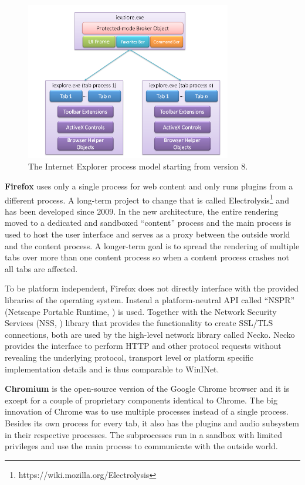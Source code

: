 \begin{figure}
    \centering
    \includegraphics[width=9cm]{Images/IE8_process_model.png}
    \caption{The Internet Explorer process model starting from version 8. \cite{IE8LCIEP}}
    \label{fig:ie8proc}
\end{figure}

\textbf{Firefox} uses only a single process for web content and only runs plugins from a different process. A long-term project to change that is called Electrolysis\footnote{https://wiki.mozilla.org/Electrolysis} and has been developed since 2009. In the new architecture, the entire rendering moved to a dedicated and sandboxed ``content'' process and the main process is used to host the user interface and serves as a proxy between the outside world and the content process. A longer-term goal is to spread the rendering of multiple tabs over more than one content process so when a content process crashes not all tabs are affected.

To be platform independent, Firefox does not directly interface with the provided libraries of the operating system. Instead a platform-neutral API called ``NSPR'' (Netscape Portable Runtime, \cite{nspr}) is used. Together with the Network Security Services (NSS, \cite{nss}) library that provides the functionality to create SSL/TLS connections, both are used by the high-level network library called Necko. Necko provides the interface to perform HTTP and other protocol requests without revealing the underlying protocol, transport level or platform specific implementation details and is thus comparable to WinINet.

\textbf{Chromium} is the open-source version of the Google Chrome browser and it is except for a couple of proprietary components identical to Chrome. The big innovation of Chrome \cite{ChromeMPA} was to use multiple processes instead of a single process. Besides its own process for every tab, it also has the plugins and audio subsystem in their respective processes. The subprocesses run in a sandbox with limited privileges and use the main process to communicate with the outside world.

